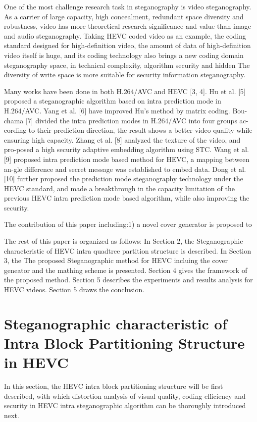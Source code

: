 \documentclass[journal,sort]{IEEEtran}
\begin{document}
One of the most challenge research task in steganography is video steganography. As a carrier of large capacity, high concealment, redundant space diversity and robustness, video has more theoretical research significance and value than image and audio steganography. Taking HEVC coded video as an example, the coding standard designed for high-definition video, the amount of data of high-definition video itself is huge, and its coding technology also brings a new coding domain steganography space, in technical complexity, algorithm security and hidden The diversity of write space is more suitable for security information steganography.

Many works have been done in both H.264/AVC and HEVC [3, 4]. Hu et al. [5] proposed a steganographic algorithm based on intra prediction mode in H.264/AVC. Yang et al. [6] have improved Hu’s method by matrix coding. Bou-chama [7] divided the intra prediction modes in H.264/AVC into four groups ac-cording to their prediction direction, the result shows a better video quality while ensuring high capacity. Zhang et al. [8] analyzed the texture of the video, and pro-posed a high security adaptive embedding algorithm using STC. Wang et al. [9] proposed intra prediction mode based method for HEVC, a mapping between an-gle difference and secret message was established to embed data. Dong et al. [10] further proposed the prediction mode steganography technology under the HEVC standard, and made a breakthrough in the capacity limitation of the previous HEVC intra prediction mode based algorithm, while also improving the security.

The contribution of  this paper including:1) a novel cover generator is proposed to 


The rest of this paper is organized as follows: In Section
2, the Steganographic characteristic of HEVC intra quadtree partition structure is described. In Section 3, the
The proposed Steganographic method for HEVC incluing the cover geneator and the mathing scheme is presented.
Section 4 gives the framework of the proposed method. Section 5 describes the experiments and results analysis for
HEVC videos. Section 5 draws the conclusion.
\section{Steganographic characteristic of Intra Block Partitioning Structure in HEVC}
In this section, the HEVC intra block partitioning structure will be first described, with which distortion analysis of visual quality, coding efficiency and security in HEVC intra steganographic algorithm can be thoroughly introduced next.
\end{document}
